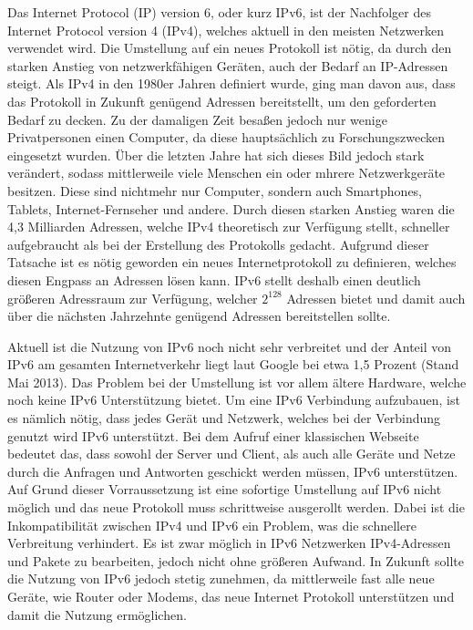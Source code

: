 \documentclass[a4paper, 12pt]{scrartcl}
\begin{document}
Das Internet Protocol (IP) version 6, oder kurz IPv6, ist der Nachfolger des Internet Protocol version 4 (IPv4), welches aktuell in den meisten Netzwerken verwendet wird.
Die Umstellung auf ein neues Protokoll ist nötig, da durch den starken Anstieg von netzwerkfähigen Geräten, auch der Bedarf an IP-Adressen steigt.
Als IPv4 in den 1980er Jahren definiert wurde, ging man davon aus, dass das Protokoll in Zukunft genügend Adressen bereitstellt, um den geforderten Bedarf zu decken.
Zu der damaligen Zeit besaßen jedoch nur wenige Privatpersonen einen Computer, da diese hauptsächlich zu Forschungszwecken eingesetzt wurden.
Über die letzten Jahre hat sich dieses Bild jedoch stark verändert, sodass mittlerweile viele Menschen ein oder mhrere Netzwerkgeräte besitzen.
Diese sind nichtmehr nur Computer, sondern auch Smartphones, Tablets, Internet-Fernseher und andere.
Durch diesen starken Anstieg waren die 4,3 Milliarden Adressen, welche IPv4 theoretisch zur Verfügung stellt, schneller aufgebraucht als bei der Erstellung des Protokolls gedacht. \cite{Ipv4Ex}
Aufgrund dieser Tatsache ist es nötig geworden ein neues Internetprotokoll zu definieren, welches diesen Engpass an Adressen lösen kann.
IPv6 stellt deshalb einen deutlich größeren Adressraum zur Verfügung, welcher $2^{128}$ Adressen bietet und damit auch über die nächsten Jahrzehnte genügend Adressen bereitstellen sollte.

Aktuell ist die Nutzung von IPv6 noch nicht sehr verbreitet \cite{Ipv6Dep} und der Anteil von IPv6 am gesamten Internetverkehr liegt laut Google \cite{goog} bei etwa 1,5 Prozent (Stand Mai 2013).
Das Problem bei der Umstellung ist vor allem ältere Hardware, welche noch keine IPv6 Unterstützung bietet.
Um eine IPv6 Verbindung aufzubauen, ist es nämlich nötig, dass jedes Gerät und Netzwerk, welches bei der Verbindung genutzt wird IPv6 unterstützt. Bei dem Aufruf einer klassischen Webseite bedeutet das, dass sowohl der Server und Client, als auch alle Geräte und Netze durch die Anfragen und Antworten geschickt werden müssen, IPv6 unterstützen.
Auf Grund dieser Vorraussetzung ist eine sofortige Umstellung auf IPv6 nicht möglich und das neue Protokoll muss schrittweise ausgerollt werden.
Dabei ist die Inkompatibilität zwischen IPv4 und IPv6 ein Problem, was die schnellere Verbreitung verhindert. Es ist zwar möglich in IPv6 Netzwerken IPv4-Adressen und Pakete zu bearbeiten, jedoch nicht ohne größeren Aufwand.
In Zukunft sollte die Nutzung von IPv6 jedoch stetig zunehmen, da mittlerweile fast alle neue Geräte, wie Router oder Modems, das neue Internet Protokoll unterstützen und damit die Nutzung ermöglichen.
\end{document}
